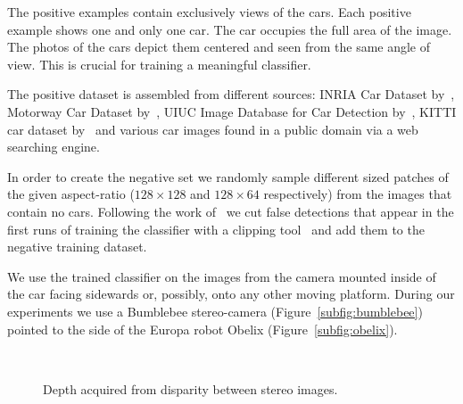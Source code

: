 The positive examples contain exclusively views of the cars. Each positive
example shows one and only one car. The car occupies the full area of the
image. The photos of the cars depict them centered and seen from the same
angle of view. This is crucial for training a meaningful classifier.

The positive dataset is assembled from different sources: INRIA Car Dataset
by~\citet{inriadata}, Motorway Car Dataset by~\citet{TMEMotorwayDataset}, UIUC
Image Database for Car Detection by~\citet{agarwal2002uiuc}, KITTI car dataset
by~\citet{Geiger2013IJRR} and various car images found in a public domain via
a web searching engine.

In order to create the negative set we randomly sample different sized patches
of the given aspect-ratio ($128 \times 128$ and $128 \times 64$ respectively)
from the images that contain no cars. Following the work of~\citet{dalal2005}
we cut false detections that appear in the first runs of training the
classifier with a clipping tool~\cite{imageclipper} and add them to the
negative training dataset.

We use the trained classifier on the images from the camera mounted inside of
the car facing sidewards or, possibly, onto any other moving platform. During
our experiments we use a Bumblebee stereo-camera
(Figure~\ref{subfig:bumblebee}) pointed to the side of the Europa robot Obelix
(Figure~\ref{subfig:obelix}).

\begin{figure}[t]%
\centering
{}\hspace{2mm}
\hspace{2mm}
\\
\caption{Depth acquired from disparity between stereo images.}
\label{fig:depth_from_disparity}
\end{figure}

